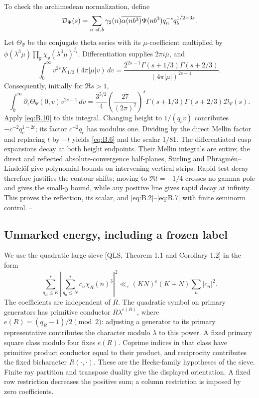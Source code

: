 \documentclass[11pt,a4paper]{article}
\begin{document}
To check the archimedean normalization, define \[
\mathcal D_\Psi(s)=\sum_{n\ {\rm sf},b}\gamma_2(n)\overline{\alpha(nb^3)}\Psi(nb^3)q_n^{-s}q_b^{1/2-3s}.
\] Let \(\Theta_\Psi\) be the conjugate theta series with its \(\mu\)-coefficient multiplied by \(\phi(\lambda^3\mu)\prod_{\mathfrak p}\chi_{\mathfrak p}(\lambda^3\mu)^{j_{\mathfrak p}}\). Differentiation supplies \(2\pi i\overline\mu\), and \[
\int_0^\infty v^{2s}K_{1/3}(4\pi|\mu|v)\,dv
=\frac{2^{2s-1}\Gamma(s+1/3)\Gamma(s+2/3)}{(4\pi|\mu|)^{2s+1}}.
\] Consequently, initially for \(\Re s>1\), \[
\int_0^\infty\partial_{\bar z}\Theta_\Psi(0,v)v^{2s-1}\,dv
=\frac{3^{5/2}}4\left(\frac{27}{(2\pi)^2}\right)^s
\Gamma(s+1/3)\Gamma(s+2/3)\mathcal D_\Psi(s).
\] Apply \eqref{eq:B.10} to this integral. Changing height to \(1/(q_cv)\) contributes \(-c^{-2}q_c^{1-2t}\); its factor \(c^{-2}q_c\) has modulus one. Dividing by the direct Mellin factor and replacing \(t\) by \(-t\) yields \eqref{eq:B.6} and the scalar \(1/81\). The differentiated cusp expansions decay at both height endpoints. Their Mellin integrals are entire; the direct and reflected absolute-convergence half-planes, Stirling and Phragmén--Lindelöf give polynomial bounds on intervening vertical strips. Rapid test decay therefore justifies the contour shifts; moving to \(\Re t=-1/4\) crosses no gamma pole and gives the small-\(y\) bound, while any positive line gives rapid decay at infinity. This proves the reflection, its scalar, and \eqref{eq:B.2}--\eqref{eq:B.7} with finite seminorm control. \hfill\(\square\)

\subsection{Unmarked energy, including a frozen label}\label{sec:B.2}

We use the quadratic large sieve {[}QLS, Theorem 1.1 and Corollary 1.2{]} in the form \[
\sum_{q_R\le K}^{*}\left|\sum_{q_n\le N}^{*}c_n\chi_R(n)^3\right|^2
\ll_\varepsilon(KN)^\varepsilon(K+N)\sum_n|c_n|^2.
\tag{B.11}\label{eq:B.11}
\] The coefficients are independent of \(R\). The quadratic symbol on primary generators has primitive conductor \(R\lambda^{e(R)}\), where \(e(R)=(q_R-1)/2\pmod2\): adjusting a generator to its primary representative contributes the character modulo \(\lambda\) to this power. A fixed primary square class modulo four fixes \(e(R)\). Coprime indices in that class have primitive product conductor equal to their product, and reciprocity contributes the fixed bicharacter \(R(\cdot,\cdot)\). These are the Hecke-family hypotheses of the sieve. Finite ray partition and transpose duality give the displayed orientation. A fixed row restriction decreases the positive sum; a column restriction is imposed by zero coefficients.
\end{document}
